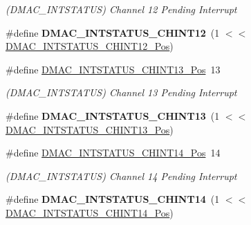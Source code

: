 \begin{DoxyCompactItemize}
\begin{DoxyCompactList}\small\item\em (D\+M\+A\+C\+\_\+\+I\+N\+T\+S\+T\+A\+T\+U\+S) Channel 12 Pending Interrupt \end{DoxyCompactList}\item 
\hypertarget{group___s_a_m_l21___d_m_a_c_gad789242abc7ac285154efa759436e7a7}{}\#define {\bfseries D\+M\+A\+C\+\_\+\+I\+N\+T\+S\+T\+A\+T\+U\+S\+\_\+\+C\+H\+I\+N\+T12}~(1 $<$$<$ \hyperlink{group___s_a_m_l21___d_m_a_c_ga9d3e098b21d6c709a09abefdd697bed7}{D\+M\+A\+C\+\_\+\+I\+N\+T\+S\+T\+A\+T\+U\+S\+\_\+\+C\+H\+I\+N\+T12\+\_\+\+Pos})\label{group___s_a_m_l21___d_m_a_c_gad789242abc7ac285154efa759436e7a7}

\item 
\hypertarget{group___s_a_m_l21___d_m_a_c_ga356be0cb3f8f8c27131f1acb5bbd2773}{}\#define \hyperlink{group___s_a_m_l21___d_m_a_c_ga356be0cb3f8f8c27131f1acb5bbd2773}{D\+M\+A\+C\+\_\+\+I\+N\+T\+S\+T\+A\+T\+U\+S\+\_\+\+C\+H\+I\+N\+T13\+\_\+\+Pos}~13\label{group___s_a_m_l21___d_m_a_c_ga356be0cb3f8f8c27131f1acb5bbd2773}

\begin{DoxyCompactList}\small\item\em (D\+M\+A\+C\+\_\+\+I\+N\+T\+S\+T\+A\+T\+U\+S) Channel 13 Pending Interrupt \end{DoxyCompactList}\item 
\hypertarget{group___s_a_m_l21___d_m_a_c_gac6914f9eae039fe977a47d82273fb43e}{}\#define {\bfseries D\+M\+A\+C\+\_\+\+I\+N\+T\+S\+T\+A\+T\+U\+S\+\_\+\+C\+H\+I\+N\+T13}~(1 $<$$<$ \hyperlink{group___s_a_m_l21___d_m_a_c_ga356be0cb3f8f8c27131f1acb5bbd2773}{D\+M\+A\+C\+\_\+\+I\+N\+T\+S\+T\+A\+T\+U\+S\+\_\+\+C\+H\+I\+N\+T13\+\_\+\+Pos})\label{group___s_a_m_l21___d_m_a_c_gac6914f9eae039fe977a47d82273fb43e}

\item 
\hypertarget{group___s_a_m_l21___d_m_a_c_gac2f540882d79fbb6129eed1ea0e16fba}{}\#define \hyperlink{group___s_a_m_l21___d_m_a_c_gac2f540882d79fbb6129eed1ea0e16fba}{D\+M\+A\+C\+\_\+\+I\+N\+T\+S\+T\+A\+T\+U\+S\+\_\+\+C\+H\+I\+N\+T14\+\_\+\+Pos}~14\label{group___s_a_m_l21___d_m_a_c_gac2f540882d79fbb6129eed1ea0e16fba}

\begin{DoxyCompactList}\small\item\em (D\+M\+A\+C\+\_\+\+I\+N\+T\+S\+T\+A\+T\+U\+S) Channel 14 Pending Interrupt \end{DoxyCompactList}\item 
\hypertarget{group___s_a_m_l21___d_m_a_c_ga8826945306edbd38098ae344cec3c8dc}{}\#define {\bfseries D\+M\+A\+C\+\_\+\+I\+N\+T\+S\+T\+A\+T\+U\+S\+\_\+\+C\+H\+I\+N\+T14}~(1 $<$$<$ \hyperlink{group___s_a_m_l21___d_m_a_c_gac2f540882d79fbb6129eed1ea0e16fba}{D\+M\+A\+C\+\_\+\+I\+N\+T\+S\+T\+A\+T\+U\+S\+\_\+\+C\+H\+I\+N\+T14\+\_\+\+Pos})\label{group___s_a_m_l21___d_m_a_c_ga8826945306edbd38098ae344cec3c8dc}


\end{DoxyCompactItemize}
